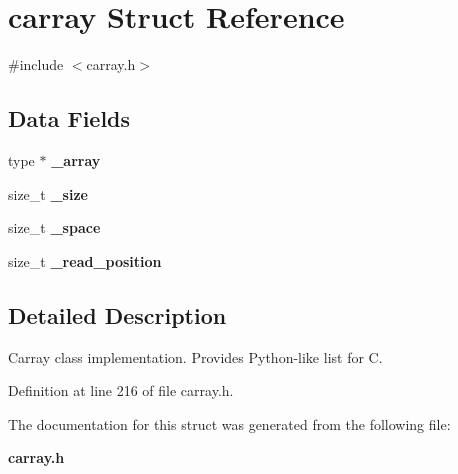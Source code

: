 \section{carray Struct Reference}
\label{structcarray}


{\ttfamily \#include $<$carray.\+h$>$}

\subsection*{Data Fields}
\begin{DoxyCompactItemize}
\item 
type $\ast$ {\bfseries \+\_\+array}\label{structcarray_ac77a0331058c929816acc7eb0398a25b}

\item 
size\+\_\+t {\bfseries \+\_\+size}\label{structcarray_a3cce90d52cb7e47b6c17d3a0e1c94842}

\item 
size\+\_\+t {\bfseries \+\_\+space}\label{structcarray_a28bbf94a5a82114026f6020b5a67ecee}

\item 
size\+\_\+t {\bfseries \+\_\+read\+\_\+position}\label{structcarray_a3896921a6f9366ba6c46c9fce6d57450}

\end{DoxyCompactItemize}


\subsection{Detailed Description}
Carray class implementation. Provides Python-\/like list for C. 

Definition at line 216 of file carray.\+h.



The documentation for this struct was generated from the following file\+:\begin{DoxyCompactItemize}
\item 
{\bf carray.\+h}\end{DoxyCompactItemize}
